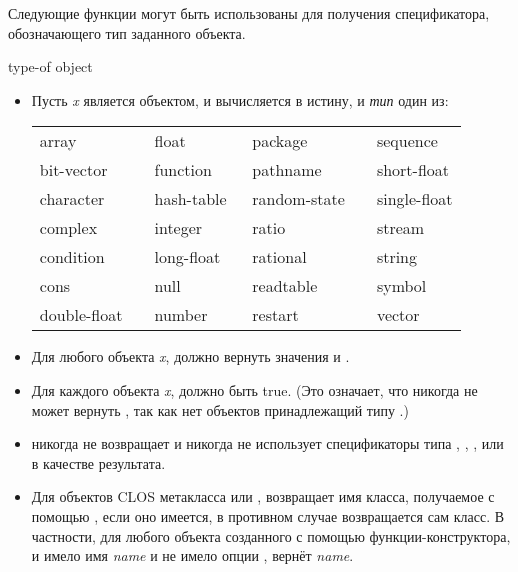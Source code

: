 Следующие функции могут быть использованы для получения спецификатора,
обозначающего тип заданного объекта.

\begin{defun}[Функция]
type-of object

\begin{itemize}
\item
  Пусть \emph{x} является объектом, и 
  вычисляется в истину, и \emph{тип} один из:

  \begin{flushleft}
    \cf
    \begin{tabular}{@{}llll@{}}
      array          & float        & package        & sequence \\
      bit-vector     & function     & pathname       & short-float \\
      character      & hash-table   & random-state~~ & single-float \\
      complex        & integer      & ratio          & stream \\
      condition      & long-float~~ & rational       & string \\
      cons           & null         & readtable      & symbol \\
      double-float~~ & number       & restart        & vector
    \end{tabular}
  \end{flushleft}

\item
  Для любого объекта \emph{x}, 
  должно вернуть значения  и .

\item
  Для каждого объекта \emph{x}, 
  должно быть true. (Это означает, что  никогда не может вернуть
  , так как нет объектов принадлежащий типу .)

\item
   никогда не возвращает  и никогда не использует
  спецификаторы типа , , ,  или  в
  качестве результата.

\item
  Для объектов CLOS метакласса  или ,
   возвращает имя класса, получаемое с помощью , если оно
  имеется, в противном случае возвращается сам класс.
  В частности, для любого объекта созданного с помощью 
  функции-конструктора, и  имело имя \emph{name} и не имело опции
  ,  вернёт \emph{name}.
\end{itemize}


\end{defun}

